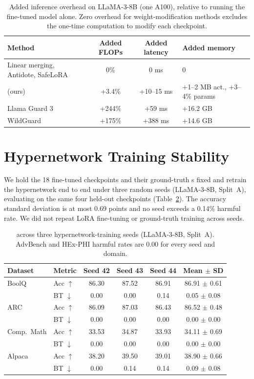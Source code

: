 \begin{table}[htbp]
\centering
\caption{Added inference overhead on LLaMA-3-8B (one A100), relative to running the fine-tuned model alone. Zero overhead for weight-modification methods excludes the one-time computation to modify each checkpoint.}
\label{tab:overhead}
\small
\setlength{\tabcolsep}{4pt}
\begin{tabular}{@{}lccl@{}}
\toprule
\textbf{Method} & \textbf{Added FLOPs} & \textbf{Added latency} & \textbf{Added memory} \\
\midrule
Linear merging, Antidote, SafeLoRA & 0\% & 0 ms & 0 \\
\method{} \ssn{} (ours) & +3.4\% & +10--15 ms & +1--2 MB act., +3--4\% params \\
Llama Guard 3 & +244\% & +59 ms & +16.2 GB \\
WildGuard & +175\% & +388 ms & +14.6 GB \\
\bottomrule
\end{tabular}
\end{table}

\section{Hypernetwork Training Stability}
\label{app:seeds}
We hold the 18 fine-tuned checkpoints and their ground-truth \ssn{}s fixed and retrain the hypernetwork end to end under three random seeds (LLaMA-3-8B, Split~A), evaluating on the same four held-out checkpoints (Table~\ref{tab:seeds}). The accuracy standard deviation is at most 0.69 points and no seed exceeds a 0.14\% harmful rate. We did not repeat LoRA fine-tuning or ground-truth \ssn{} training across seeds.

\begin{table}[htbp]
\centering
\caption{\method{} across three hypernetwork-training seeds (LLaMA-3-8B, Split~A). AdvBench and HEx-PHI harmful rates are 0.00 for every seed and domain.}
\label{tab:seeds}
\small
\setlength{\tabcolsep}{5pt}
\begin{tabular}{@{}llcccc@{}}
\toprule
\textbf{Dataset} & \textbf{Metric} & \textbf{Seed 42} & \textbf{Seed 43} & \textbf{Seed 44} & \textbf{Mean $\pm$ SD} \\
\midrule
BoolQ      & Acc $\uparrow$ & 86.30 & 87.52 & 86.91 & 86.91 $\pm$ 0.61 \\
           & BT $\downarrow$ & 0.00 & 0.00 & 0.14 & 0.05 $\pm$ 0.08 \\
ARC        & Acc $\uparrow$ & 86.09 & 87.03 & 86.43 & 86.52 $\pm$ 0.48 \\
           & BT $\downarrow$ & 0.00 & 0.00 & 0.00 & 0.00 $\pm$ 0.00 \\
Comp.\ Math & Acc $\uparrow$ & 33.53 & 34.87 & 33.93 & 34.11 $\pm$ 0.69 \\
           & BT $\downarrow$ & 0.00 & 0.00 & 0.00 & 0.00 $\pm$ 0.00 \\
Alpaca     & Acc $\uparrow$ & 38.20 & 39.50 & 39.01 & 38.90 $\pm$ 0.66 \\
           & BT $\downarrow$ & 0.00 & 0.14 & 0.14 & 0.09 $\pm$ 0.08 \\
\bottomrule
\end{tabular}
\end{table}
